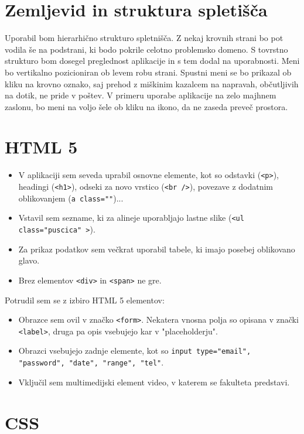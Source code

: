 \documentclass[a4paper,11pt]{article}
\begin{document}
\section{Zemljevid in struktura spletišča}

Uporabil bom hierarhično strukturo spletnišča. Z nekaj krovnih strani bo pot vodila še na podstrani, ki bodo pokrile celotno problemsko domeno. S tovrstno strukturo bom dosegel preglednost aplikacije in s tem dodal na uporabnosti.\newline
Meni bo vertikalno pozicioniran ob levem robu strani. Spustni meni se bo prikazal ob kliku na krovno oznako, saj prehod z miškinim kazalcem na napravah, občutljivih na dotik, ne pride v poštev. V primeru uporabe aplikacije na zelo majhnem zaslonu, bo meni na voljo šele ob kliku na ikono, da ne zaseda preveč prostora.

\section{HTML 5}

\begin{itemize}
\item V aplikaciji sem seveda uprabil osnovne elemente, kot so odstavki (\texttt{<p>}), headingi (\texttt{<h1>}), odseki za novo vrstico (\texttt{<br />}), povezave z dodatnim oblikovanjem (\texttt{a class=""})...
\item Vstavil sem sezname, ki za alineje uporabljajo lastne slike (\texttt{<ul class="puscica" >}).
\item Za prikaz podatkov sem večkrat uporabil tabele, ki imajo posebej oblikovano glavo.
\item Brez elementov \texttt{<div>} in \texttt{<span>} ne gre.
\end{itemize}

Potrudil sem se z izbiro HTML 5 elementov:
\begin{itemize}
\item Obrazce sem ovil v značko \texttt{<form>}. Nekatera vnosna polja so opisana v znački \texttt{<label>}, druga pa opis vsebujejo kar v "placeholderju".
\item Obrazci vsebujejo zadnje elemente, kot so \texttt{input type="email", "password", "date", "range", "tel"}.
\item Vključil sem multimedijski element video, v katerem se fakulteta predstavi.
\end{itemize}

\section{CSS}
\end{document}
